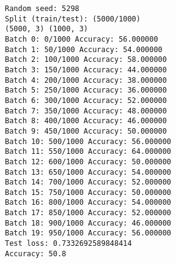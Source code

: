 \documentclass[11pt]{article}
\begin{document}
    \begin{Verbatim}[commandchars=\\\{\}]
Random seed: 5298
Split (train/test): (5000/1000)
(5000, 3) (1000, 3)
Batch 0: 0/1000 Accuracy: 56.000000
Batch 1: 50/1000 Accuracy: 54.000000
Batch 2: 100/1000 Accuracy: 58.000000
Batch 3: 150/1000 Accuracy: 44.000000
Batch 4: 200/1000 Accuracy: 38.000000
Batch 5: 250/1000 Accuracy: 36.000000
Batch 6: 300/1000 Accuracy: 52.000000
Batch 7: 350/1000 Accuracy: 48.000000
Batch 8: 400/1000 Accuracy: 46.000000
Batch 9: 450/1000 Accuracy: 50.000000
Batch 10: 500/1000 Accuracy: 56.000000
Batch 11: 550/1000 Accuracy: 64.000000
Batch 12: 600/1000 Accuracy: 50.000000
Batch 13: 650/1000 Accuracy: 54.000000
Batch 14: 700/1000 Accuracy: 52.000000
Batch 15: 750/1000 Accuracy: 50.000000
Batch 16: 800/1000 Accuracy: 54.000000
Batch 17: 850/1000 Accuracy: 52.000000
Batch 18: 900/1000 Accuracy: 46.000000
Batch 19: 950/1000 Accuracy: 56.000000
Test loss: 0.7332692589848414
Accuracy: 50.8

    \end{Verbatim}


    
    
    
    
\end{document}
